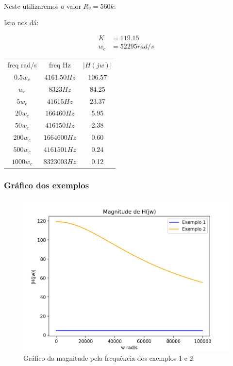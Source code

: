 Neste utilizaremos o valor  $R_2 = 560k$:


Isto nos dá:


\begin{equation}
    \begin{aligned}
        K   & = 119.15      \\
        w_c & = 52295 rad/s
    \end{aligned}
\end{equation}


\begin{center}
    \begin{tabular}{ |c|c|c| }
        \hline
        freq rad/s & freq Hz      & $\lvert H(jw) \rvert$ \\
        $0.5 w_c$  & $4161.50 Hz$ & 106.57                \\
        $w_c$      & $8323 Hz$    & 84.25                 \\
        $5 w_c$    & $41615 Hz$   & 23.37                 \\
        $20 w_c$   & $166460 Hz$  & 5.95                  \\
        $50 w_c$   & $416150 Hz$  & 2.38                  \\
        $200 w_c$  & $1664600 Hz$ & 0.60                  \\
        $500 w_c$  & $4161501 Hz$ & 0.24                  \\
        $1000 w_c$ & $8323003 Hz$ & 0.12                  \\
        \hline
    \end{tabular}
\end{center}


\newpage


\subsubsection{Gráfico dos exemplos}


\begin{figure}[h]
    \centering
    \includegraphics[width=1\columnwidth]{images/plot_bode.png}
    \caption{Gráfico da magnitude pela frequência dos exemplos 1 e 2.}
\end{figure}


\newpage

